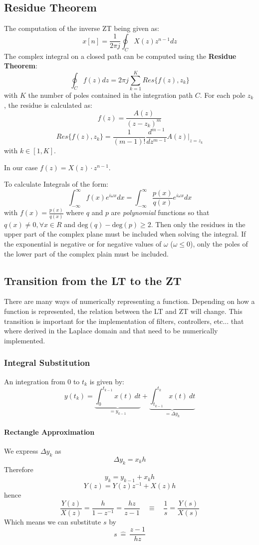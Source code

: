 \documentclass[10pt,a4paper]{article}
\begin{document}
\subsection{Residue Theorem}
The computation of the inverse ZT being given as:
$$
x[n] = \frac{1}{2\pi j} \oint_C X(z)z^{n-1} dz
$$
The complex integral on a closed path can be computed using the \textbf{Residue Theorem}:
$$
\boxed{
\oint_C f(z)dz = 2\pi j \sum_{k=1}^K Res\{f(z),z_k\}
}
$$
with $K$ the number of poles contained in the integration path $C$. For each pole $z_k$, the residue is calculated as:
$$
f(z) = \frac{A(z)}{(z-z_k)^m}
$$
$$
\boxed{
Res\{f(z),z_k\} = \frac{1}{(m-1)!} \frac{d^{m-1}}{dz^{m-1}} A(z) \vert_{z = z_k}
}
$$
with $k \in [1,K]$.

In our case $f(z) = X(z)\cdot z^{n-1}$.

To calculate Integrals of the form:
$$
\int_{-\infty}^{\infty} f(x) e^{i\omega x} dx = \int_{-\infty}^{\infty} \frac{p(x)}{q(x)} e^{i\omega x} dx
$$
with 
$ f(x) = \frac{p(x)}{q(x)} $ where $q$ and $p$ are \emph{polynomial} functions so that $ q(x) \neq 0, \forall x \in R $ and $\text{deg}(q) - \text{deg}(p) \geq 2 $. Then only the residues in the upper part of the complex plane must be included when solving the integral. 
If the exponential is negative or for negative values of $\omega$ ($\omega \leq 0$), only the poles of the lower part of the complex plain must be included. 

\subsection{Transition from the LT to the ZT}
There are many ways of numerically representing a function. Depending on how a function is represented, the relation between the LT and ZT will change. This transition is important for the implementation of filters, controllers, etc... that where derived in the Laplace domain and that need to be numerically implemented. 

\subsubsection{Integral Substitution}
An integration from $0$ to $t_k$ is given by:
$$
y(t_k) = \underbrace{\int_{0}^{t_{k-1}} x(t) \: dt}_{=y_{k-1}} + \underbrace{\int_{t_{k-1}}^{t_{k}} x(t) \: dt}_{= \Delta y_k}
$$
\paragraph{Rectangle Approximation}
We express $\Delta y_k$ as 
$$
\Delta y_k = x_k h
$$
Therefore $$ y_k = y_{k-1} + x_k h $$
$$ Y(z) = Y(z)z^{-1} + X(z)h $$
hence
$$
\frac{Y(z)}{X(z)} = \frac{h}{1-z^{-1}} = \frac{hz}{z-1} \quad \equiv \quad \frac{1}{s} = \frac{Y(s)}{X(s)}
$$
Which means we can substitute $s$ by
$$
\boxed{
s \: \hat{=} \: \frac{z-1}{hz}
}
$$
\end{document}
